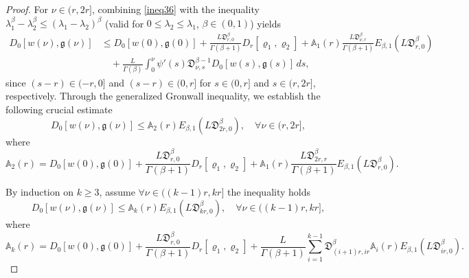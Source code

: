 \documentclass[reqno]{amsart}
\begin{document}
\begin{proof}
For $\nu \in ( r, 2 r]$, combining \eqref{ineq36} with the inequality 
$\lambda_{1}^{\beta} - \lambda_{2}^{\beta} \leq (\lambda_{1} 
- \lambda_{2})^{\beta}$ (valid for $0 \leq \lambda_{2} \leq \lambda_{1}$, 
$\beta \in (0,1)$) yields
\begin{align*}
D_0[ w(\nu ), \mathfrak{g}(\nu )] 
&\leq  D_0[ w(0), \mathfrak{g}(0)]+\frac{ L\mathfrak{D}_{ r,0}^{\beta}}{\Gamma(\beta+1)}
  D_{ r}[\varrho_{1}, \varrho_{2}] +\mathbb{A}_{1}( r) 
  \frac{ L\mathfrak{D}_{\nu , r}^{\beta}}{\Gamma(\beta+1)} E_{\beta, 1}
  ( L\mathfrak{D}_{ r,0}^{\beta}) \\
&\quad +\frac{ L}{\Gamma(\beta)} \int_0^{\nu } \psi'(s)\mathfrak{D}_{\nu ,s}^{\beta-1}
 D_0[ w(s), \mathfrak{g}(s)]\,ds,
\end{align*}
since $(s- r) \in(- r, 0]$ and $(s- r) \in(0, r]$ for $s \in(0, r]$ and 
$s \in( r, 2 r]$, respectively. Through the generalized Gronwall inequality, we 
establish the following crucial estimate
\begin{equation}\label{ineq38}
D_0[ w(\nu ), \mathfrak{g}(\nu )] \leq \mathbb{A}_{2}( r)
 E_{\beta, 1}( L\mathfrak{D}_{2 r,0}^{\beta}), \quad \forall \nu \in( r, 2 r],
\end{equation}
where
\begin{equation}\label{eq39}
\mathbb{A}_{2}( r)=D_0[ w(0), \mathfrak{g}(0)]
+\frac{ L\mathfrak{D}_{ r,0}^{\beta}}{\Gamma(\beta+1)} D_{ r}[\varrho_{1}, 
\varrho_{2}]+\mathbb{A}_{1}( r) 
\frac{ L\mathfrak{D}_{2 r, r}^{\beta}}{\Gamma(\beta+1)} E_{\beta, 1}
( L\mathfrak{D}_{ r,0}^{\beta}) . 
\end{equation}

By induction on $k \geq 3$, assume $\forall \nu \in ((k-1) r, k r]$ the inequality holds
\begin{equation}\label{ineq310}
D_0[ w(\nu ), \mathfrak{g}(\nu )] \leq \mathbb{A}_{k}( r) 
E_{\beta, 1}( L\mathfrak{D}_{k r,0}^{\beta}), \quad \forall \nu \in((k-1) r, k r], 
\end{equation}
where
\begin{equation}\label{eq311}
\mathbb{A}_{k}( r)=  D_0[ w(0), \mathfrak{g}(0)]
+\frac{ L\mathfrak{D}_{ r,0}^{\beta}}{\Gamma(\beta+1)} D_{ r}[\varrho_{1}, 
\varrho_{2}] 
 +\frac{ L}{\Gamma(\beta+1)} \sum_{i=1}^{k-1}\mathfrak{D}_{(i+1) r,i r}^{\beta} 
\mathbb{A}_{i}( r) E_{\beta, 1}( L\mathfrak{D}_{i r,0}^{\beta}) . 
\end{equation}


\end{proof}
\end{document}
